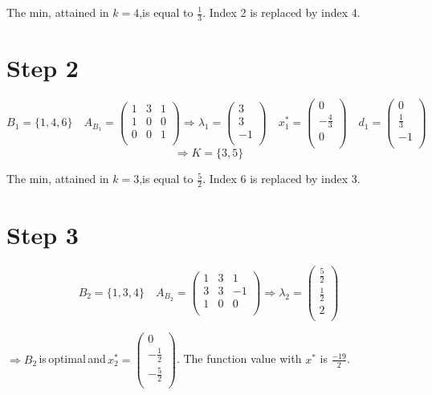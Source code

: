 \documentclass[a4paper,11pt,french]{article}
\begin{document}
The min, attained in $k=4$,is equal to $\frac{1}{3}$. Index 2 is replaced by index 4.
   \section{Step 2}
  \begin{displaymath}
  B_1=\{1,4,6\}\quad A_{B_1}=\left(
\begin{array}{ccc}
1 & 3 & 1\\
1 & 0 & 0 \\
0 & 0 & 1\\
\end{array}
\right) \Rightarrow \lambda_1=\left(\begin{array}{c} 3\\ 3\\ -1\\ \end{array}\right)\quad x^*_1=\left(\begin{array}{c} 0\\ -\frac{4}{3}\\ 0\\ \end{array}\right)\quad d_1=\left(\begin{array}{c} 0\\ \frac{1}{3}\\ -1\\ \end{array}\right) \end{displaymath} 
  \begin{displaymath}
    \Rightarrow K=\{3,5\}
  \end{displaymath}
   
  The min, attained in $k=3$,is equal to $\frac{5}{2}$. Index 6 is replaced by index 3.
   
     \section{Step 3}
  \begin{displaymath}
  B_2=\{1,3,4\}\quad A_{B_2}=\left(
\begin{array}{ccc}
1 & 3 & 1\\
3 & 3 & -1 \\
1 & 0 & 0\\
\end{array}
\right) \Rightarrow \lambda_2=\left(\begin{array}{c} \frac{5}{2}\\ \frac{1}{2}\\ 2\\ \end{array}\right)
   \end{displaymath}
    
  $\Rightarrow B_2$\,is\,optimal\,and\,$x^*_2=\left(\begin{array}{c}0 \\ -\frac{1}{2}\\ -\frac{5}{2}\\ \end{array}\right)$. The function value with $x^*$ is $\frac{-19}{2}$.
    
\end{document}
